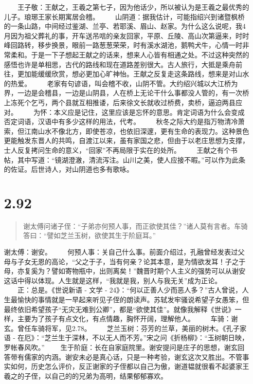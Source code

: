\documentclass[]{book}
\begin{document}
　　王子敬：王献之，王羲之第七子，因为他话少，所以被认为是王羲之最优秀的儿子。琅琊王家长期寓居会稽。
　　山阴道：据我估计，可能指绍兴到诸暨枫桥的一条山路，中间经过鉴湖、兰亭、若耶溪、眉山、赵家。为什么这么说呢，我4月因为祖父葬礼的事，开车送吊唁的亲友回家，平原、丘陵、高山次第逼来，时时峰回路转，移步换景，眼前一路葱葱荣荣，时有溪水湖池，鹅鸭犬牛，心情一时非常柔和。于是一下子想起王献之的话来，想来人心皆有相通之处。不过这种突然的感悟也许是单相思，古代的路线和现在道路差别很大。古人旅行，大抵是乘舟前往，更加能缓缓欣赏，想必更加心旷神怡。王献之反复走这条路线，想来是对山水的热爱。
　　老家有句谚语，叫会稽不收，山阴不管。大约绍兴城以大江桥为界，一边是会稽县，一边是山阴县，人在桥上无论干什么事都没人管的，有一次桥上冻死个乞丐，两个县就互相推诿，后来徐文长就收过桥费，卖桥，逼迫两县应对。
　　为怀：本义应是记住，这里应该是忘怀的意思。肯定词语为什么会变成否定词语，汉语中有多少这样的用法，代考。
　　秋冬之际大约是指万物清冷萧索，但江南山水不像北方，即使苍凉，也依旧深邃，更有生命的表现力。这种景色更能触发东晋人的共鸣，自渡江以来，虽有家国之悲，但由于以老庄思想为支撑，士人反复拷问生命的意义，``回家''不再局限于实在的处所。
　　王献之有个书帖，其中写道：``镜湖澄澈，清流泻注。山川之美，使人应接不暇。''可以作为此条的佐证。后世诗人，对山阴道也多有歌咏。

\section{2.92}\label{section-138}

\begin{quote}
谢太傅问诸子侄：``子弟亦何预人事，而正欲使其佳？''诸人莫有言者。车骑答曰：``譬如芝兰玉树，欲使其生于阶庭耳。''
\end{quote}

谢太傅：谢安。
　　何预人事：关自己什么事。前面介绍过，孔融曾经发表过父母与子女无恩的高论，``父之于子，当有何亲？论其本意，是为情欲发耳！子之于母，亦复奚为？譬如寄物瓶中，出则离矣！''魏晋时期个人主义的强势可以从谢安这话中得以体现。人生就是这样，``我就是我，别人与我无关''成为正论。
　　正：总是。《世说新语 - 文学 -
24》：``何以正善人少而恶人多？''古人曾说，人生最愉快的事情就是一早起来听见子侄的朗读声。苏轼发牢骚说希望子女愚笨，但最终依旧希望孩子``无灾无难到公卿''，都是``欲使其佳''。就像我解释《世说》一样，主要为了孩子有点文化，有点情趣，胸怀开阔，理解他人。
　　车骑：谢玄。曾任车骑将军，见2.78。
　　芝兰玉树：芬芳的兰草，美丽的树木。《孔子家语 -
在厄》：``芝兰生于深林，不以无人而不芳。''宋之问《折杨柳》：``玉树朝日映，罗帐春风吹。''
　　生于阶庭：长在自家庭院里。谢安提问是庄子的思想，谢玄回答带有儒家的内涵。谢安未必是真心话，只是一种考验，谢玄这次又胜出。不管事实如何，历史怎么评价，反正谢家的子侄都以自己为傲，谢道韫就很看不起婆家王羲之的子侄，以自己的的兄弟为高明，结果郁郁寡欢。
\end{document}
